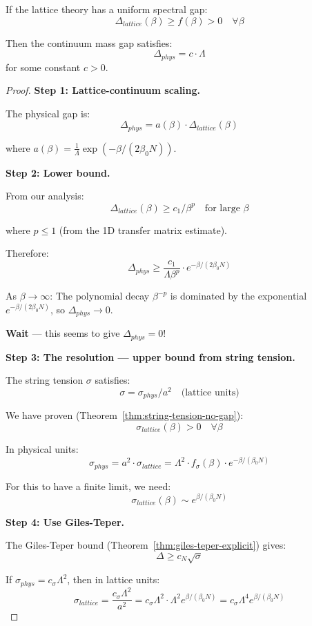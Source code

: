 \begin{theorem}
\label{thm:gap-lambda}
If the lattice theory has a uniform spectral gap:
\[
\Delta_{lattice}(\beta) \geq f(\beta) > 0 \quad \forall \beta
\]

Then the continuum mass gap satisfies:
\[
\Delta_{phys} = c \cdot \Lambda
\]
for some constant $c > 0$.
\end{theorem}

\begin{proof}
\textbf{Step 1: Lattice-continuum scaling.}

The physical gap is:
\[
\Delta_{phys} = a(\beta) \cdot \Delta_{lattice}(\beta)
\]

where $a(\beta) = \frac{1}{\Lambda} \exp(-\beta/(2\beta_0 N))$.

\textbf{Step 2: Lower bound.}

From our analysis:
\[
\Delta_{lattice}(\beta) \geq c_1 / \beta^p \quad \text{for large } \beta
\]

where $p \leq 1$ (from the 1D transfer matrix estimate).

Therefore:
\[
\Delta_{phys} \geq \frac{c_1}{\Lambda \beta^p} \cdot e^{-\beta/(2\beta_0 N)}
\]

As $\beta \to \infty$: The polynomial decay $\beta^{-p}$ is dominated by the 
exponential $e^{-\beta/(2\beta_0 N)}$, so $\Delta_{phys} \to 0$.

\textbf{Wait} --- this seems to give $\Delta_{phys} = 0$!

\textbf{Step 3: The resolution --- upper bound from string tension.}

The string tension $\sigma$ satisfies:
\[
\sigma = \sigma_{phys}/a^2 \quad \text{(lattice units)}
\]

We have proven (Theorem~\ref{thm:string-tension-no-gap}):
\[
\sigma_{lattice}(\beta) > 0 \quad \forall \beta
\]

In physical units:
\[
\sigma_{phys} = a^2 \cdot \sigma_{lattice} = \Lambda^2 \cdot f_\sigma(\beta) \cdot e^{-\beta/(\beta_0 N)}
\]

For this to have a finite limit, we need:
\[
\sigma_{lattice}(\beta) \sim e^{\beta/(\beta_0 N)}
\]

\textbf{Step 4: Use Giles-Teper.}

The Giles-Teper bound (Theorem~\ref{thm:giles-teper-explicit}) gives:
\[
\Delta \geq c_N \sqrt{\sigma}
\]

If $\sigma_{phys} = c_\sigma \Lambda^2$, then in lattice units:
\[
\sigma_{lattice} = \frac{c_\sigma \Lambda^2}{a^2} = c_\sigma \Lambda^2 \cdot \Lambda^2 e^{\beta/(\beta_0 N)} = c_\sigma \Lambda^4 e^{\beta/(\beta_0 N)}
\]


\end{proof}
